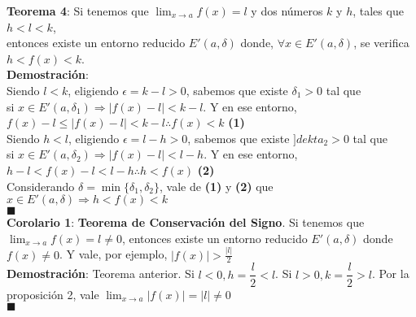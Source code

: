 \documentclass[11pt,a4paper]{article}
\newcommand*{\QEDA}{\null\nobreak\hfill\ensuremath{\blacksquare}}
\begin{document}
\noindent \textbf{Teorema 4}: Si tenemos que $\displaystyle{\lim_{x\to a}f(x) = l}$ y dos n\'umeros $k$ y $h$, tales que $h<l<k$,\\
entonces existe un entorno reducido $E'(a,\delta)$ donde, $\forall x \in E'(a,\delta)$, se verifica $h < f(x) < k$.\\
\textbf{Demostraci\'on}: \\
Siendo $l < k$, eligiendo $\epsilon = k - l > 0$, sabemos que existe $\delta_1 > 0$ tal que\\ si $x\in E'(a,\delta_1) \Rightarrow |f(x)-l|<k-l$. Y en ese entorno, $f(x)-l \leq |f(x)-l| < k-l \therefore f(x) < k$ \hfill \textbf{(1)}\\
Siendo $h < l$, eligiendo $\epsilon = l - h > 0$, sabemos que existe $]dekta_2 > 0$ tal que\\ si $x\in E'(a,\delta_2) \Rightarrow |f(x)-l|<l-h$. Y en ese entorno, $h-l<f(x)-l<l-h \therefore h<f(x)$ \hfill \textbf{(2)}\\
Considerando $\delta=\min\{\delta_1,\delta_2\}$, vale de \textbf{(1)} y \textbf{(2)} que $x\in E'(a,\delta) \Rightarrow h < f(x) < k$\\
\QEDA\\

\noindent \textbf{Corolario 1}: \textbf{Teorema de Conservaci\'on del Signo}. Si tenemos que $\displaystyle{\lim_{x\to a}f(x) = l \not = 0}$, entonces existe un entorno reducido $E'(a,\delta)$ donde $f(x)\not = 0$. Y vale, por ejemplo, $|f(x)| > \frac{|l|}{2}$\\
\noindent \textbf{Demostraci\'on}: Teorema anterior. Si $l<0, h=\dfrac{l}{2}<l$. Si $l>0, k=\dfrac{l}{2}>l$. Por la proposici\'on 2, vale $\displaystyle{\lim_{x\to a}|f(x)| = |l| \not = 0}$\\
\QEDA\\
\end{document}

